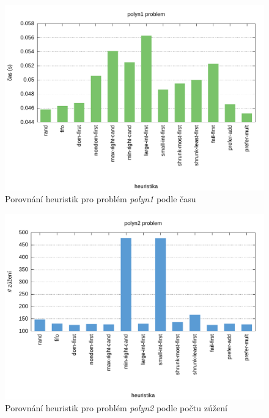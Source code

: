 {\begin{figure}[H]
\centering
\includegraphics[scale=0.68]{chart/polyn1_time.pdf}
\caption{Porovnání heuristik pro problém \emph{polyn1} podle času}
\end{figure}

\begin{figure}[H]
\centering
\includegraphics[scale=0.68]{chart/polyn2_nar.pdf}
\caption{Porovnání heuristik pro problém \emph{polyn2} podle počtu zúžení}
\end{figure}

}
